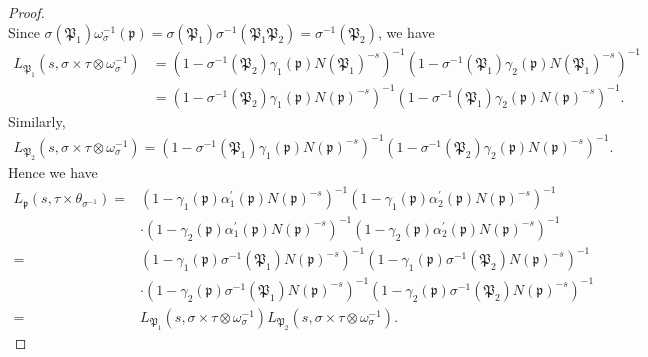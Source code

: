 \documentclass[12pt]{amsart}
\theoremstyle{remark}
\begin{document}
\begin{proof}
\begin{equation*}
\end{equation*}
Since $\sigma(\mathfrak{P}_1) \omega_{\sigma}^{-1}(\mathfrak{p})=\sigma(\mathfrak{P}_1) \sigma^{-1}(\mathfrak{P}_1\mathfrak{P}_2 )=\sigma^{-1}(\mathfrak{P}_2)$, we have
\begin{equation*}
\begin{split}
L_{\mathfrak{P}_1}(s, \sigma\times \tau\otimes\omega_\sigma^{-1}) &=	(1-\sigma^{-1}(\mathfrak{P}_2) \gamma_1(\mathfrak{p})  N(\mathfrak{P}_1)^{-s})^{-1} (1-\sigma^{-1}(\mathfrak{P}_1) \gamma_2(\mathfrak{p})  N(\mathfrak{P}_1)^{-s})^{-1} \\
&=	(1-\sigma^{-1}(\mathfrak{P}_2) \gamma_1(\mathfrak{p})  N(\mathfrak{p})^{-s})^{-1} (1-\sigma^{-1}(\mathfrak{P}_1) \gamma_2(\mathfrak{p})  N(\mathfrak{p})^{-s})^{-1} .
\end{split}
\end{equation*}
Similarly, 
\begin{equation*}
\begin{split}
L_{\mathfrak{P}_2}(s, \sigma\times \tau\otimes\omega_\sigma^{-1})  =	(1-\sigma^{-1}(\mathfrak{P}_1) \gamma_1(\mathfrak{p})  N(\mathfrak{p})^{-s})^{-1} (1-\sigma^{-1}(\mathfrak{P}_2) \gamma_2(\mathfrak{p})  N(\mathfrak{p})^{-s})^{-1} .
\end{split}
\end{equation*}
Hence we have
\begin{equation*}
\begin{split}
L_{\mathfrak{p}}(s, \tau\times\theta_{\sigma^{-1}}) 
=& (1-\gamma_1(\mathfrak{p}) \alpha_1^\prime(\mathfrak{p}) N(\mathfrak{p})^{-s})^{-1} (1- \gamma_1(\mathfrak{p})\alpha_2^\prime(\mathfrak{p}) N(\mathfrak{p})^{-s})^{-1} \\
& \cdot (1-\gamma_2(\mathfrak{p}) \alpha_1^\prime(\mathfrak{p}) N(\mathfrak{p})^{-s})^{-1}(1- \gamma_2(\mathfrak{p})\alpha_2^\prime(\mathfrak{p}) N(\mathfrak{p})^{-s})^{-1} 	\\
=& (1-\gamma_1(\mathfrak{p}) \sigma^{-1}(\mathfrak{P}_1) N(\mathfrak{p})^{-s})^{-1}(1- \gamma_1(\mathfrak{p})\sigma^{-1}(\mathfrak{P}_2) N(\mathfrak{p})^{-s})^{-1} \\
&\cdot  (1-\gamma_2(\mathfrak{p}) \sigma^{-1}(\mathfrak{P}_1) N(\mathfrak{p})^{-s})^{-1}(1- \gamma_2(\mathfrak{p})\sigma^{-1}(\mathfrak{P}_2) N(\mathfrak{p})^{-s})^{-1} 	\\
=& L_{\mathfrak{P}_1}(s, \sigma\times \tau\otimes\omega_\sigma^{-1}) L_{\mathfrak{P}_2}(s, \sigma\times \tau\otimes\omega_\sigma^{-1}).	
\end{split}
\end{equation*}

\end{proof}
\end{document}
